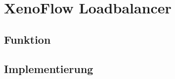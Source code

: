 %
%

\chapter{XenoFlow Loadbalancer}
\label{cha:implementation}
\section{Funktion}
\section{Implementierung}
